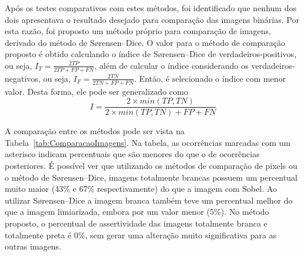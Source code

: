 \documentclass[12pt,oneside,a4paper,english,french,spanish,brazil,]{abntex2}
\begin{document}
Após os testes comparativos com estes métodos, foi identificado que nenhum dos dois apresentava o resultado desejado para comparação das imagens binárias. Por esta razão, foi proposto um método próprio para comparação de imagens, derivado do método de Sørensen–Dice. O valor para o método de comparação proposto é obtido calculando o índice de Sørensen–Dice de verdadeiros-positivos, ou seja, \(I_T = \frac{2TP}{2TP + FP + FN}\), além de calcular o índice considerando os verdadeiros-negativos, ou seja, \(I_F = \frac{2TN}{2TN + FP + FN}\). Então, é selecionado o índice com menor valor. Desta forma, ele pode ser generalizado como
\[I = \frac{2 \times min(TP, TN)}{2 \times min(TP, TN) + FP + FN}\]

A comparação entre os métodos pode ser vista na Tabela~\ref{tab:ComparacaoImagens}. Na tabela, as ocorrências marcadas com um asterisco indicam percentuais que são menores do que o de ocorrências posteriores. É possível ver que utilizando os métodos de comparação de pixels ou o método de Sørensen–Dice, imagens totalmente brancas possuem um percentual muito maior (43\% e 67\% respectivamente) do que a imagem com Sobel. Ao utilizar Sørensen–Dice a imagem branca também teve um percentual melhor do que a imagem limiarizada, embora por um valor menor (5\%). No método proposto, o percentual de assertividade das imagens totalmente branca e totalmente preta é 0\%, sem gerar uma alteração muito significativa para as outras imagens.
\end{document}
